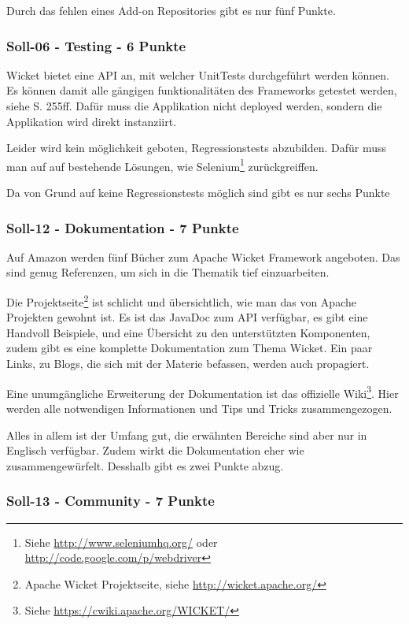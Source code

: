  Durch das fehlen eines Add-on Repositories gibt es nur fünf Punkte.
  
  \subsubsection{Soll-06 - Testing - 6 Punkte}
  
  Wicket bietet eine \ac{API} an, mit welcher UnitTests durchgeführt werden
  können. Es können damit alle gängigen funktionalitäten des Frameworks
  getestet werden, siehe \cite{Wicket} S. 255ff. Dafür muss die Applikation
  nicht deployed werden, sondern die Applikation wird direkt instanziirt.
  
  Leider wird kein möglichkeit geboten, Regressionstests abzubilden. Dafür muss
  man auf auf bestehende Lösungen, wie
  Selenium\footnote{Siehe \url{http://www.seleniumhq.org/} oder
  \url{http://code.google.com/p/webdriver}} zurückgreiffen.
  
  Da von Grund auf keine Regressionstests möglich sind gibt es nur sechs Punkte
  
  \subsubsection{Soll-12 - Dokumentation - 7 Punkte}

  Auf Amazon werden fünf Bücher zum Apache Wicket Framework
  angeboten. Das sind genug Referenzen, um sich in die Thematik tief
  einzuarbeiten.
  
  Die Projektseite\footnote{Apache Wicket Projektseite, siehe
  \url{http://wicket.apache.org/}} ist schlicht und übersichtlich, wie man das
  von Apache Projekten gewohnt ist. Es ist das JavaDoc zum \ac{API} verfügbar,
  es gibt eine Handvoll Beispiele, und eine Übersicht zu den unterstützten
  Komponenten, zudem gibt es eine komplette Dokumentation zum Thema Wicket. Ein
  paar Links, zu Blogs, die sich mit der Materie befassen, werden auch
  propagiert.
  
  Eine unumgängliche Erweiterung der Dokumentation ist das offizielle
  Wiki\footnote{Siehe \url{https://cwiki.apache.org/WICKET/}}. Hier werden alle
  notwendigen Informationen und Tips und Tricks zusammengezogen.
  
  Alles in allem ist der Umfang gut, die erwähnten Bereiche sind aber nur in
  Englisch verfügbar. Zudem wirkt die Dokumentation eher wie zusammengewürfelt.
  Desshalb gibt es zwei Punkte abzug.
 
  \subsubsection{Soll-13 - Community - 7 Punkte}
  
